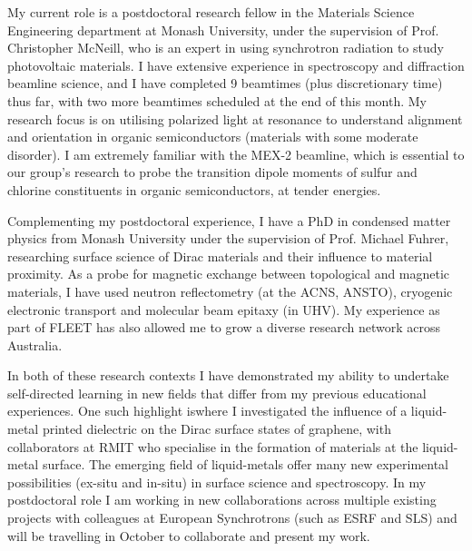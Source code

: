 \documentclass[10pt,a4paper,ragged2e,withhyper,paragraphstrue]{altacv}
\newcommand{\pind}{\hspace{24pt}}
\begin{document}
{    %
    \pind My current role is a postdoctoral research fellow in the Materials Science Engineering department at Monash University, under the supervision of Prof. Christopher McNeill, who is an expert in using synchrotron radiation to study photovoltaic materials. I have extensive experience in spectroscopy and diffraction beamline science, and I have completed 9 beamtimes (plus discretionary time) thus far, with two more beamtimes scheduled at the end of this month. My research focus is on utilising polarized light at resonance to understand alignment and orientation in organic semiconductors (materials with some moderate disorder). I am extremely familiar with the MEX-2 beamline, which is essential to our group's research to probe the transition dipole moments of sulfur and chlorine constituents in organic semiconductors, at tender energies.
    
    \pind Complementing my postdoctoral experience, I have a PhD in condensed matter physics from Monash University under the supervision of Prof. Michael Fuhrer, researching surface science of Dirac materials and their influence to material proximity. As a probe for magnetic exchange between topological and magnetic materials, I have used neutron reflectometry (at the ACNS, ANSTO), cryogenic electronic transport and molecular beam epitaxy (in UHV). My experience as part of FLEET has also allowed me to grow a diverse research network across Australia. %
    
    \pind In both of these research contexts I have demonstrated my ability to undertake self-directed learning in new fields that differ from my previous educational experiences. One such highlight iswhere I investigated the influence of a liquid-metal printed dielectric on the Dirac surface states of graphene, with collaborators at RMIT who specialise in the formation of materials at the liquid-metal surface. The emerging field of liquid-metals offer many new experimental possibilities (ex-situ and in-situ) in surface science and spectroscopy. In my postdoctoral role I am working in new collaborations across multiple existing projects with colleagues at European Synchrotrons (such as ESRF and SLS) and will be travelling in October to collaborate and present my work.

}
\end{document}
